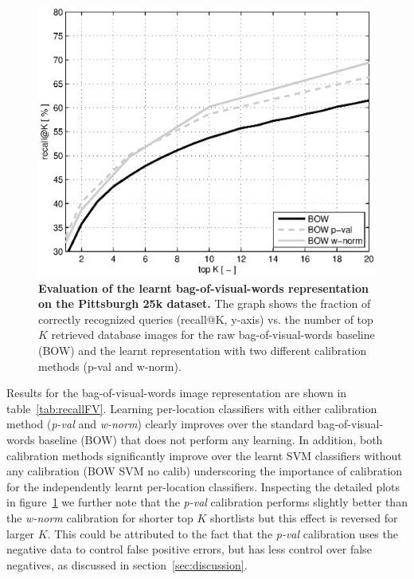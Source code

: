    \begin{figure}[tbp]
        \centering
        \includegraphics[width=1.1\linewidth]{imgs/plotPitt25kBOW}  
        \caption{
            \textbf{Evaluation of the learnt bag-of-visual-words representation on the Pittsburgh 25k \cite{Gronat13} dataset.} The graph shows the fraction of correctly recognized queries (recall@K, y-axis) vs. the number of top $K$ retrieved database images for the raw bag-of-visual-words baseline (BOW) and the learnt representation with two different calibration methods (p-val and w-norm).
        }
        \label{fig:recallBOW}
    \end{figure}

    Results for the bag-of-visual-words image representation are shown in table~\ref{tab:recallFV}. %
    Learning per-location classifiers with either calibration method (\emph{p-val} and \emph{w-norm}) clearly improves over the standard bag-of-visual-words baseline (BOW) that does not perform any learning. In addition, both calibration methods significantly improve over the learnt SVM classifiers without any calibration (BOW SVM no calib) underscoring the importance of calibration for the independently learnt per-location classifiers.  
    Inspecting the detailed plots in figure~\ref{fig:recallBOW} we further note that the  \emph{p-val} calibration performs slightly better than the \emph{w-norm} calibration for shorter top $K$ shortlists but this effect is reversed for larger $K$. This could be attributed to the fact that the \emph{p-val} calibration uses the negative data to control false positive errors, but has less control over false negatives, as discussed in section~\ref{sec:discussion}. 

